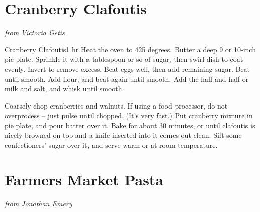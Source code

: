 \documentclass[openany]{book}
\begin{document}
\chapter{Cranberry Clafoutis}\label{cranberry-clafoutis}

\emph{from Victoria Getis}

\begin{recipe}{Cranberry Clafoutis}{}{1 hr}
\freeform Heat the oven to 425 degrees. Butter a deep 9 or 10-inch pie plate. Sprinkle it with a tablespoon or so of sugar, then swirl dish to coat evenly. Invert to remove excess.
\freeform Beat eggs well, then add remaining sugar. Beat until smooth. Add flour, and beat again until smooth. Add the half-and-half or milk and salt, and whisk until smooth.

\freeform Coarsely chop cranberries and walnuts. If using a food processor, do not overprocess -- just pulse until chopped. (It's very fast.) Put cranberry mixture in pie plate, and pour batter over it.
\freeform Bake for about 30 minutes, or until clafoutis is nicely browned on top and a knife inserted into it comes out clean. Sift some confectioners' sugar over it, and serve warm or at room temperature.


\end{recipe}

\chapter{Farmers Market Pasta}\label{farmers-market-pasta}

\emph{from Jonathan Emery}
\end{document}
